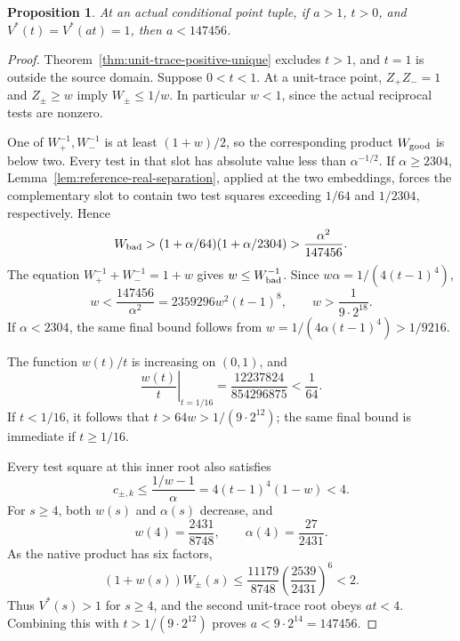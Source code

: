 \documentclass[11pt,a4paper]{article}
\newtheorem{proposition}[theorem]{Proposition}
\begin{document}
\begin{proposition}\label{prop:unit-trace-positive-scale}
At an actual conditional point tuple, if $a>1$, $t>0$, and
$V^*(t)=V^*(at)=1$, then $a<147456$.
\end{proposition}
\begin{proof}
Theorem~\ref{thm:unit-trace-positive-unique} excludes $t>1$,
and $t=1$ is outside the source domain. Suppose $0<t<1$.
At a unit-trace point, $Z_+Z_-=1$ and $Z_\pm\ge w$ imply
$W_\pm\le1/w$. In particular $w<1$, since the actual reciprocal
tests are nonzero.

One of $W_+^{-1},W_-^{-1}$ is at least $(1+w)/2$, so the corresponding
product $W_{\rm good}$ is below two. Every test in that slot has
absolute value less than $\alpha^{-1/2}$. If $\alpha\ge2304$,
Lemma~\ref{lem:reference-real-separation}, applied at the two embeddings,
forces the complementary slot to contain two test squares exceeding
$1/64$ and $1/2304$, respectively. Hence
\[
 W_{\rm bad}>
  (1+\alpha/64)(1+\alpha/2304)>
                         \frac{\alpha^2}{147456}.
\]
The equation $W_+^{-1}+W_-^{-1}=1+w$ gives
$w\le W_{\rm bad}^{-1}$. Since $w\alpha=1/(4(t-1)^4)$,
\[
 w<\frac{147456}{\alpha^2}
   =2359296w^2(t-1)^8,
 \qquad
                  w>\frac1{9\cdot2^{18}}.
\]
If $\alpha<2304$, the same final bound follows from
$w=1/(4\alpha(t-1)^4)>1/9216$.

The function $w(t)/t$ is increasing on $(0,1)$, and
\[
 \left.\frac{w(t)}t\right|_{t=1/16}
       =\frac{12237824}{854296875}<\frac1{64}.
\]
If $t<1/16$, it follows that $t>64w>1/(9\cdot2^{12})$;
the same final bound is immediate if $t\ge1/16$.

Every test square at this inner root also satisfies
\[
 c_{\pm,k}\le\frac{1/w-1}{\alpha}
           =4(t-1)^4(1-w)<4.
\]
For $s\ge4$, both $w(s)$ and $\alpha(s)$ decrease, and
\[
 w(4)=\frac{2431}{8748},\qquad
 \alpha(4)=\frac{27}{2431}.
\]
As the native product has six factors,
\[
 (1+w(s))W_\pm(s)
 \le\frac{11179}{8748}\left(\frac{2539}{2431}\right)^6<2.
\]
Thus $V^*(s)>1$ for $s\ge4$, and the second unit-trace root obeys
$at<4$. Combining this with $t>1/(9\cdot2^{12})$ proves
$a<9\cdot2^{14}=147456$.
\end{proof}
\end{document}
